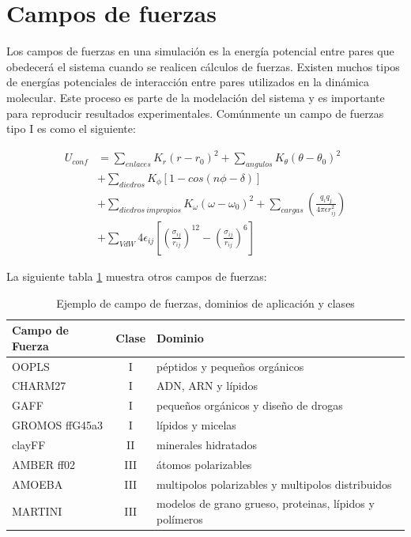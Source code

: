 \section{Campos de fuerzas}

Los campos de fuerzas en una simulación es la energía potencial entre pares que obedecerá el sistema cuando se realicen cálculos de fuerzas. Existen muchos tipos de energías potenciales de interacción entre pares utilizados en la dinámica molecular. Este proceso es parte de la modelación del sistema y es importante para reproducir resultados experimentales. Comúnmente un campo de fuerzas tipo I es como el siguiente:

\begin{align}\label{FF}
    U_{conf} &= \sum_{enlaces}K_r\left(r-r_0\right)^2 + \sum_{angulos}K_{\theta}\left(\theta-\theta_0\right)^2 \\
             &+ \sum_{diedros}K_{\phi}\left[1-cos(n\phi-\delta)\right] \\
             &+ \sum_{diedros\ impropios}K_{\omega}\left(\omega-\omega_0\right)^2 + \sum_{cargas}\left(\frac{q_i q_j}{4\pi \epsilon r^2_{ij}}\right) \\
             &+ \sum_{VdW} 4 \epsilon_{ij}\left[\left(\frac{\sigma_{ij}}{r_{ij}}\right)^{12}-\left(\frac{\sigma_{ij}}{r_{ij}}\right)^{6}\right]    
\end{align}

La siguiente tabla \ref{FFallen} muestra otros campos de fuerzas:

\begin{table}[h!]
    \centering
    \begin{tabular}{l c l}
    \hline
    Campo de Fuerza & Clase & Dominio \\
    \hline
    OOPLS & I & péptidos y pequeños orgánicos \\
    CHARM27 & I & ADN, ARN y lípidos \\
    GAFF & I & pequeños orgánicos y diseño de drogas \\
    GROMOS ffG45a3 & I & lípidos y micelas\\
    clayFF & II & minerales hidratados \\
    AMBER ff02 & III & átomos polarizables \\
    AMOEBA & III & multipolos polarizables y multipolos distribuidos \\
    MARTINI & III & modelos de grano grueso, proteinas, lípidos y polímeros \\
    \hline
    \end{tabular}
    \caption{Ejemplo de campo de fuerzas, dominios de aplicación y clases\cite{Allen2017}}
    \label{FFallen}
\end{table}

